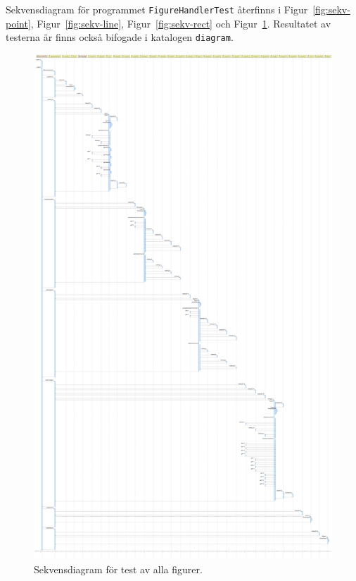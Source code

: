 Sekvensdiagram för programmet \texttt{FigureHandlerTest} återfinns i
Figur~\ref{fig:sekv-point}, Figur~\ref{fig:sekv-line},
Figur~\ref{fig:sekv-rect} och Figur~\ref{fig:sekv-all}.
Resultatet av testerna är finns också bifogade i katalogen \texttt{diagram}.



\begin{figure}[ht]
\centering
\includegraphics[width=0.9\linewidth]{diagram/figureHandlerTest_All_Sequence-Diagram.png}
\caption{Sekvensdiagram för test av alla figurer. 
}
\label{fig:sekv-all}
\end{figure}

